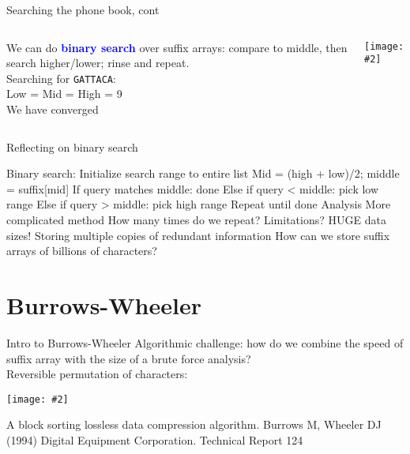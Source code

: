 \documentclass{beamer}
\renewcommand{\c}[1]{\begin{center}#1\end{center}}
\newcommand{\blu}[1]{\textcolor{blue}{\textbf{#1}}}
\newcommand{\gr}[2][.95]{\c{\texttt{[image: \#2]}}}
\begin{document}
\begin{frame}{Searching the phone book, cont}
    \begin{columns}
        \begin{column}{0.5\textwidth}
            We can do \blu{binary search} over suffix arrays: compare to middle, then search higher/lower; rinse and repeat.\\
            \bigskip
            Searching for \texttt{GATTACA}:\\
            \bigskip
            Low = Mid = High = 9\\
            We have converged
        \end{column}
        \begin{column}{0.5\textwidth}
            \gr{l6_figs/s14_phonebook6.png}
        \end{column}
    \end{columns}
\end{frame} 

\begin{frame}{Reflecting on binary search}
    \begin{outline}
        \1[] Binary search:
            \2 Initialize search range to entire list
                \3 Mid = (high + low)/2; middle = suffix[mid]
                \3 If query matches middle: done
                \3 Else if query < middle: pick low range
                \3 Else if query > middle: pick high range
            \2 Repeat until done 
        \1[] Analysis
            \2 More complicated method
            \2 How many times do we repeat?
        \1[] Limitations? 
            \2 HUGE data sizes! Storing multiple copies of redundant information
            \2 How can we store suffix arrays of billions of characters?
    \end{outline}
\end{frame}

\section{Burrows-Wheeler}

\begin{frame}{Intro to Burrows-Wheeler}
    Algorithmic challenge: how do we combine the speed of suffix array with the size of a brute force analysis?\\
    \bigskip
    Reversible permutation of characters:
    \gr[0.8]{l6_figs/s16_bwt.png}
    \tiny A block sorting lossless data compression algorithm. Burrows M, Wheeler DJ (1994) Digital Equipment Corporation. Technical Report 124
\end{frame}
\end{document}
